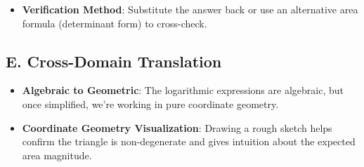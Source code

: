 \documentclass[12pt]{article}
\begin{document}
\begin{strategicbox}
\begin{itemize}[leftmargin=*]
    \item \textbf{Verification Method}: Substitute the answer back or use an alternative area formula (determinant form) to cross-check.
\end{itemize}

\subsection*{E. Cross-Domain Translation}
\begin{itemize}[leftmargin=*]
    \item \textbf{Algebraic to Geometric}: The logarithmic expressions are algebraic, but once simplified, we're working in pure coordinate geometry.
    
    \item \textbf{Coordinate Geometry Visualization}: Drawing a rough sketch helps confirm the triangle is non-degenerate and gives intuition about the expected area magnitude.
\end{itemize}
\end{strategicbox}
\end{document}
